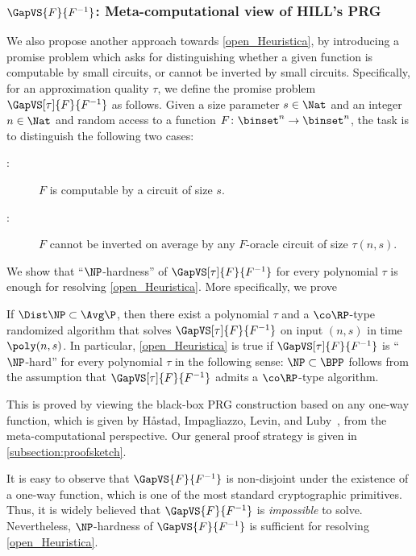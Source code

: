 \documentclass{toc}
\begin{document}
\subsubsection{\texorpdfstring{$\GapVS{F}{F^{-1}}$}{Gap(F vs F(-1))}: Meta-computational view of HILL's PRG}

We also propose another approach towards
\cref{open_Heuristica},
by introducing a promise problem
which asks for distinguishing whether a given function is
computable by small circuits,
or cannot be inverted by small circuits.
Specifically,
for an approximation quality $\tau$,
we define the promise problem $\GapVS[\tau]{F}{F^{-1}}$
as follows.
Given a size parameter $s \in \Nat$ and an integer $n \in \Nat$ and random access to a function $F \colon \binset^n \to \binset^n$,
the task is to distinguish the following two cases:
\begin{description}
  \item
        [\Yes:]
        $F$ is computable by a circuit of size $s$.
  \item
        [\No:]
        $F$ cannot be inverted on average by any $F$-oracle circuit of size $\tau(n, s)$.
\end{description}

We show that ``$\NP$-hardness'' of $\GapVS[\tau]{F}{F^{-1}}$
for every polynomial $\tau$
is enough for resolving \cref{open_Heuristica}.
More specifically,
we prove
\begin{theorem}
  If $\Dist\NP \subset \Avg\P$,
  then there exist a polynomial $\tau$
  and
  a $\co\RP$-type randomized algorithm that solves
  $\GapVS[\tau]{F}{F^{-1}}$
  on input $(n, s)$
  in time $\poly(n, s)$.
  In particular,
  \cref{open_Heuristica} is true
  if $\GapVS[\tau]{F}{F^{-1}}$ is \textup{``}$\NP$-hard\textup{''} for every polynomial $\tau$
  in the following sense:
  $\NP \subset \BPP$ follows from the assumption that
  $\GapVS[\tau]{F}{F^{-1}}$ admits a $\co\RP$-type algorithm.
\end{theorem}
This is proved by viewing the black-box PRG construction
based on any one-way function,
which is given by
H{\aa}stad, Impagliazzo, Levin, and Luby~\cite{HastadILL99_siamcomp_journals},
from the meta-computational perspective.
Our general proof strategy is given in \cref{subsection:proofsketch}.

It is easy to observe that
$\GapVS{F}{F^{-1}}$
is non-disjoint
under
the existence of a one-way function,
which is one of the most standard cryptographic primitives.
Thus,
it is widely believed that
$\GapVS{F}{F^{-1}}$ is
\emph{impossible} to solve.
Nevertheless, $\NP$-hardness of $\GapVS{F}{F^{-1}}$
is sufficient for resolving \cref{open_Heuristica}.
\end{document}
